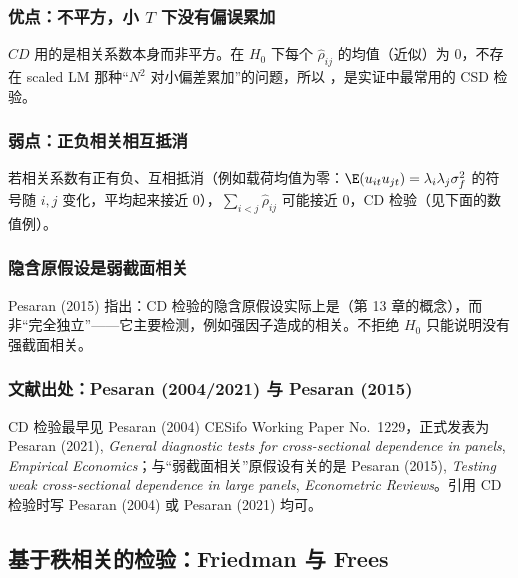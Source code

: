 \subsubsection{优点：不平方，小 \texorpdfstring{$T$}{T} 下没有偏误累加}

$CD$ 用的是相关系数本身而非平方。在 $H_0$ 下每个 $\hat\rho_{ij}$ 的均值（近似）为 0，不存在 scaled LM 那种“$N^2$ 对小偏差累加”的问题，所以 ，是实证中最常用的 CSD 检验。

\subsubsection{弱点：正负相关相互抵消}

若相关系数有正有负、互相抵消（例如载荷均值为零：$\E(u_{it}u_{jt})=\lambda_i\lambda_j\sigma_f^2$ 的符号随 $i,j$ 变化，平均起来接近 0），$\sum_{i<j}\hat\rho_{ij}$ 可能接近 0，CD 检验（见下面的数值例）。

\subsubsection{隐含原假设是弱截面相关}

Pesaran (2015) 指出：CD 检验的隐含原假设实际上是（第 13 章的概念），而非“完全独立”——它主要检测，例如强因子造成的相关。不拒绝 $H_0$ 只能说明没有强截面相关。

\subsubsection{文献出处：Pesaran (2004/2021) 与 Pesaran (2015)}

CD 检验最早见 Pesaran (2004) CESifo Working Paper No.~1229，正式发表为 Pesaran (2021), \textit{General diagnostic tests for cross-sectional dependence in panels}, \textit{Empirical Economics}；与“弱截面相关”原假设有关的是 Pesaran (2015), \textit{Testing weak cross-sectional dependence in large panels}, \textit{Econometric Reviews}。引用 CD 检验时写 Pesaran (2004) 或 Pesaran (2021) 均可。

\subsection{基于秩相关的检验：Friedman 与 Frees}

